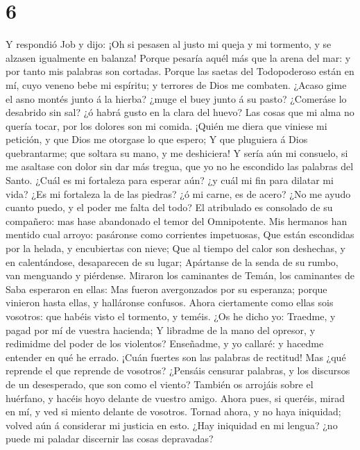\hypertarget{section-5}{%
\section{6}\label{section-5}}

 Y respondió Job y dijo:  ¡Oh si pesasen al
justo mi queja y mi tormento, y se alzasen igualmente en balanza!
 Porque pesaría aquél más que la arena del mar: y por tanto
mis palabras son cortadas.  Porque las saetas del
Todopoderoso están en mí, cuyo veneno bebe mi espíritu; y terrores de
Dios me combaten.  ¿Acaso gime el asno montés junto á la
hierba? ¿muge el buey junto á su pasto?  ¿Comeráse lo
desabrido sin sal? ¿ó habrá gusto en la clara del huevo? 
Las cosas que mi alma no quería tocar, por los dolores son mi comida.
 ¡Quién me diera que viniese mi petición, y que Dios me
otorgase lo que espero;  Y que pluguiera á Dios
quebrantarme; que soltara su mano, y me deshiciera!  Y
sería aún mi consuelo, si me asaltase con dolor sin dar más tregua, que
yo no he escondido las palabras del Santo.  ¿Cuál es mi
fortaleza para esperar aún? ¿y cuál mi fin para dilatar mi vida?
 ¿Es mi fortaleza la de las piedras? ¿ó mi carne, es de
acero?  ¿No me ayudo cuanto puedo, y el poder me falta del
todo?  El atribulado es consolado de su compañero: mas hase
abandonado el temor del Omnipotente.  Mis hermanos han
mentido cual arroyo: pasáronse como corrientes impetuosas, 
Que están escondidas por la helada, y encubiertas con nieve;
 Que al tiempo del calor son deshechas, y en calentándose,
desaparecen de su lugar;  Apártanse de la senda de su
rumbo, van menguando y piérdense.  Miraron los caminantes
de Temán, los caminantes de Saba esperaron en ellas:  Mas
fueron avergonzados por su esperanza; porque vinieron hasta ellas, y
halláronse confusos.  Ahora ciertamente como ellas sois
vosotros: que habéis visto el tormento, y teméis.  ¿Os he
dicho yo: Traedme, y pagad por mí de vuestra hacienda;  Y
libradme de la mano del opresor, y redimidme del poder de los violentos?
 Enseñadme, y yo callaré: y hacedme entender en qué he
errado.  ¡Cuán fuertes son las palabras de rectitud! Mas
¿qué reprende el que reprende de vosotros?  ¿Pensáis
censurar palabras, y los discursos de un desesperado, que son como el
viento?  También os arrojáis sobre el huérfano, y hacéis
hoyo delante de vuestro amigo.  Ahora pues, si queréis,
mirad en mí, y ved si miento delante de vosotros.  Tornad
ahora, y no haya iniquidad; volved aún á considerar mi justicia en esto.
 ¿Hay iniquidad en mi lengua? ¿no puede mi paladar
discernir las cosas depravadas?

